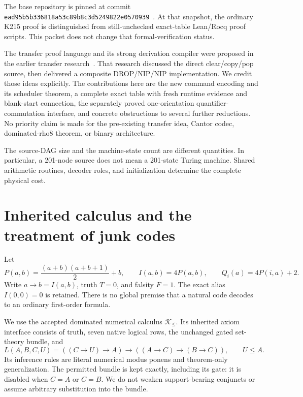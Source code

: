 \documentclass[11pt]{article}
\newcommand{\Kdom}{\mathcal K_{\le}}
\begin{document}
The base repository is pinned at commit
\texttt{ead95b5b336818a53c89b8c3d5249822e0570939}~\cite{repo}.
At that snapshot, the ordinary K215 proof is distinguished from still-unchecked exact-table Lean/Rocq proof scripts. This packet does not change that formal-verification status.

The transfer proof language and its strong derivation compiler were proposed in the earlier transfer research~\cite{transfer}. That research discussed the direct clear/copy/pop source, then delivered a composite DROP/NIP/NIP implementation. We credit those ideas explicitly. The contributions here are the new command encoding and its scheduler theorem, a complete exact table with fresh runtime evidence and blank-start connection, the separately proved one-orientation quantifier-commutation interface, and concrete obstructions to several further reductions. No priority claim is made for the pre-existing transfer idea, Cantor codec, dominated-rho8 theorem, or binary architecture.

The source-DAG size and the machine-state count are different quantities. In particular, a 201-node source does not mean a 201-state Turing machine. Shared arithmetic routines, decoder roles, and initialization determine the complete physical cost.

\section{Inherited calculus and the treatment of junk codes}
\label{sec:calculus}

Let
\[
 P(a,b)=\frac{(a+b)(a+b+1)}2+b,\qquad
 I(a,b)=4P(a,b),\qquad Q_i(a)=4P(i,a)+2.
\]
Write $a\to b=I(a,b)$, truth $T=0$, and falsity $F=1$. The exact alias $I(0,0)=0$ is retained. There is no global premise that a natural code decodes to an ordinary first-order formula.

We use the accepted dominated numerical calculus $\Kdom$. Its inherited axiom interface consists of truth, seven native logical rows, the unchanged gated set-theory bundle, and
\[
 L(A,B,C,U)=((C\to U)\to A)\to((A\to C)\to(B\to C)),
 \qquad U\le A.
\]
Its inference rules are literal numerical modus ponens and theorem-only generalization. The permitted bundle is kept exactly, including its gate: it is disabled when $C=A$ or $C=B$. We do not weaken support-bearing conjuncts or assume arbitrary substitution into the bundle.
\end{document}
